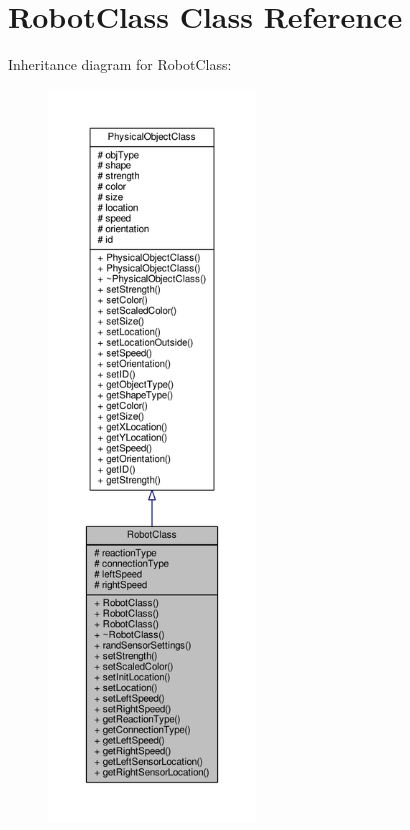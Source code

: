 \hypertarget{classRobotClass}{\section{Robot\-Class Class Reference}
\label{classRobotClass}
}


Inheritance diagram for Robot\-Class\-:
\nopagebreak
\begin{figure}[H]
\begin{center}
\leavevmode
\includegraphics[height=550pt]{classRobotClass__inherit__graph}
\end{center}
\end{figure}


